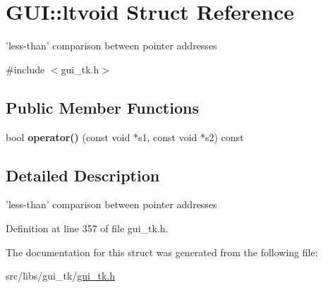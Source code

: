 \hypertarget{structGUI_1_1ltvoid}{\section{G\-U\-I\-:\-:ltvoid Struct Reference}
\label{structGUI_1_1ltvoid}
}


'less-\/than' comparison between pointer addresses  




{\ttfamily \#include $<$gui\-\_\-tk.\-h$>$}

\subsection*{Public Member Functions}
\begin{DoxyCompactItemize}
\item 
\hypertarget{structGUI_1_1ltvoid_a706be252c47c846981c7f1c47f2ea186}{bool {\bfseries operator()} (const void $\ast$s1, const void $\ast$s2) const }\label{structGUI_1_1ltvoid_a706be252c47c846981c7f1c47f2ea186}

\end{DoxyCompactItemize}


\subsection{Detailed Description}
'less-\/than' comparison between pointer addresses 

Definition at line 357 of file gui\-\_\-tk.\-h.



The documentation for this struct was generated from the following file\-:\begin{DoxyCompactItemize}
\item 
src/libs/gui\-\_\-tk/\hyperlink{gui__tk_8h}{gui\-\_\-tk.\-h}\end{DoxyCompactItemize}
